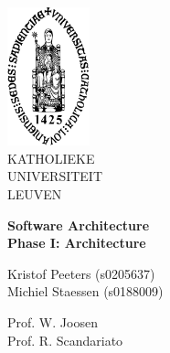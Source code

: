 \thispagestyle{empty}
\begin{flushleft}
\includegraphics[height=40mm]{figs/sedes_2.jpg}\\
\small
KATHOLIEKE\\ UNIVERSITEIT\\ LEUVEN
\end{flushleft}


\begin{center}
\textbf{Software Architecture} \\
\LARGE
\textbf{Phase I: Architecture}
\end{center}


\begin{flushleft}
\small
Kristof Peeters (s0205637)\\
Michiel Staessen (s0188009)
\end{flushleft}

\begin{flushleft}
Prof. W. Joosen \\
Prof. R. Scandariato
\end{flushleft}
